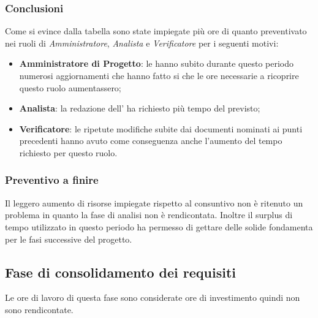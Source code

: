 \subsubsection{Conclusioni}
Come si evince dalla tabella sono state impiegate più ore di quanto preventivato nei ruoli di \textit{Amministratore}, \textit{Analista} e \textit{Verificatore} per i seguenti motivi:
\begin{itemize}
	\item \textbf{Amministratore di Progetto}: le  hanno subito durante questo periodo numerosi aggiornamenti che hanno fatto si che le ore necessarie a ricoprire questo ruolo aumentassero;
	\item \textbf{Analista}: la redazione dell' ha richiesto più tempo del previsto;
	\item \textbf{Verificatore}: le ripetute modifiche subite dai documenti nominati ai punti precedenti hanno avuto come conseguenza anche l'aumento del tempo richiesto per questo ruolo.
\end{itemize}

\subsubsection{Preventivo a finire}
Il leggero aumento di risorse impiegate rispetto al consuntivo non è ritenuto un problema in quanto la fase di analisi non è rendicontata. Inoltre il surplus di tempo utilizzato in questo periodo ha permesso di gettare delle solide fondamenta per le fasi successive del progetto.


\subsection{Fase di consolidamento dei requisiti} \label{_consuntivoConsolidamentoDeiRequisiti}
Le ore di lavoro di questa fase sono considerate ore di investimento quindi non sono rendicontate.

